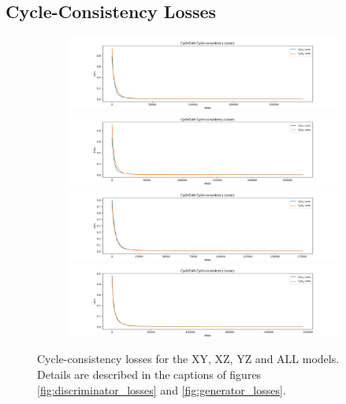 \documentclass[12pt, fleqn, titlepage]{article}
\newcommand{\1}[1]{\mathds{1}\left[#1\right]}
\begin{document}
\subsection{Cycle-Consistency Losses}\label{cycle_loss}
\begin{figure}[H]
	\centering
	\begin{subfigure}[b]{0.8\textwidth}
		\centering
		\includegraphics[width=\linewidth]{imgs/cycle_losses/XY_model_cycle_losses}
		\hfill
		\includegraphics[width=\linewidth]{imgs/cycle_losses/XZ_model_cycle_losses}
		\hfill
		\includegraphics[width=\linewidth]{imgs/cycle_losses/YZ_model_cycle_losses}
		\hfill
		\includegraphics[width=\linewidth]{imgs/cycle_losses/ALL_model_cycle_losses}
	\end{subfigure}
	\caption{Cycle-consistency losses for the XY, XZ, YZ and ALL models. Details are described in the captions of figures \ref{fig:discriminator_losses} and \ref{fig:generator_losses}.}
	\label{fig:cycle_losses}
\end{figure}
\end{document}
